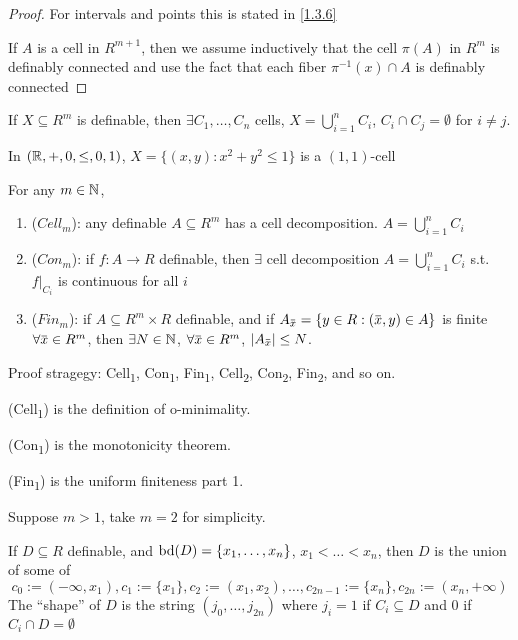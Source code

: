 \documentclass[11pt]{article}
\begin{document}
\begin{proof}
For intervals and points this is stated in \ref{1.3.6}

If \(A\) is a cell in \(R^{m+1}\), then we assume inductively that the cell \(\pi(A)\) in \(R^m\)
is definably connected and use the fact that each fiber \(\pi^{-1}(x)\cap A\) is definably connected
\end{proof}

\begin{theorem}
If \(X\subseteq R^m\) is definable, then \(\exists C_1,\dots,C_n\) cells, \(X=\bigcup_{i=1}^nC_i\), \(C_i\cap C_j=\emptyset\)
for \(i\neq j\).
\end{theorem}

\begin{examplle}[]
In \((\mathbb{R},+,0,\le,0,1)\), \(X=\{(x,y):x^2+y^2\le 1\}\) is a \((1,1)\)-cell
\end{examplle}

\begin{theorem}[]
For any \(m\in\mathbb{N}\),
\begin{enumerate}
\item (\(Cell_m\)): any definable \(A\subseteq R^m\) has a cell decomposition. \(A=\bigcup_{i=1}^nC_i\)
\item (\(Con_m\)): if \(f:A\to R\) definable, then \(\exists\) cell decomposition \(A=\bigcup_{i=1}^nC_i\)
s.t. \(f|_{C_i}\) is continuous for all \(i\)
\item (\(Fin_m\)): if \(A\subseteq R^m\times R\) definable, and if \(A_{\barx}=\{y\in R:(\barx,y)\in A\}\) is finite
\(\forall\barx\in R^m\), then \(\exists N\in\mathbb{N}\), \(\forall\barx\in R^m\), \(\abs{A_{\barx}}\le N\).
\end{enumerate}
\end{theorem}

Proof stragegy: Cell\textsubscript{1}, Con\textsubscript{1}, Fin\textsubscript{1},
Cell\textsubscript{2}, Con\textsubscript{2}, Fin\textsubscript{2}, and so on.

(Cell\textsubscript{1}) is the definition of o-minimality.

(Con\textsubscript{1}) is the monotonicity theorem.

(Fin\textsubscript{1}) is the uniform finiteness part 1.

Suppose \(m>1\), take \(m=2\) for simplicity.

If \(D\subseteq R\) definable, and \(\operatorname{bd}(D)=\{x_1,\dots,x_n\}\), \(x_1<\dots<x_n\), then \(D\) is the union of some
of
\begin{equation*}
c_0:=(-\infty,x_1),c_1:=\{x_1\},c_2:=(x_1,x_2),\dots,c_{2n-1}:=\{x_n\},c_{2n}:=(x_n,+\infty)
\end{equation*}
The ``shape'' of \(D\) is the string \((j_0,\dots,j_{2n})\) where \(j_i=1\) if \(C_i\subseteq D\) and 0
if \(C_i\cap D=\emptyset\)
\end{document}
